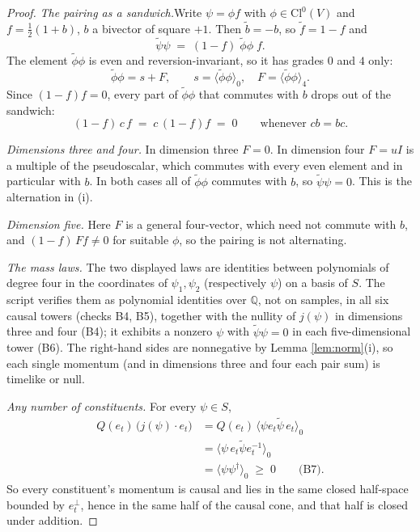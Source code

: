 \documentclass[11pt]{article}
\theoremstyle{definition}
\newcommand{\Cl}{\mathrm{Cl}}
\newcommand{\rev}[1]{\widetilde{#1}}
\newcommand{\ip}[1]{\langle #1 \rangle}
\newcommand{\pstep}[1]{\par\smallskip\noindent\textit{#1.}\enspace}
\begin{document}
\begin{proof}
\textit{The pairing as a sandwich.}\enspace Write $\psi = \phi f$ with $\phi \in \Cl^{0}(V)$ and $f = \tfrac{1}{2}(1 + b)$, $b$ a bivector of square $+1$. Then $\rev{b} = -b$, so $\rev{f} = 1 - f$ and
\[
\rev{\psi}\psi \;=\; (1 - f)\;\rev{\phi}\phi\;f.
\]
The element $\rev{\phi}\phi$ is even and reversion-invariant, so it has grades $0$ and $4$ only:
\[
\rev{\phi}\phi = s + F, \qquad s = \ip{\rev{\phi}\phi}_{0}, \quad F = \ip{\rev{\phi}\phi}_{4}.
\]
Since $(1 - f)f = 0$, every part of $\rev{\phi}\phi$ that commutes with $b$ drops out of the sandwich:
\[
(1 - f)\,c\,f \;=\; c\,(1 - f)f \;=\; 0 \qquad \text{whenever } cb = bc.
\]

\pstep{Dimensions three and four} In dimension three $F = 0$. In dimension four $F = uI$ is a multiple of the pseudoscalar, which commutes with every even element and in particular with $b$. In both cases all of $\rev{\phi}\phi$ commutes with $b$, so $\rev{\psi}\psi = 0$. This is the alternation in (i).

\pstep{Dimension five} Here $F$ is a general four-vector, which need not commute with $b$, and $(1 - f)\,F f \neq 0$ for suitable $\phi$, so the pairing is not alternating.

\pstep{The mass laws} The two displayed laws are identities between polynomials of degree four in the coordinates of $\psi_{1}, \psi_{2}$ (respectively $\psi$) on a basis of $S$. The script verifies them as polynomial identities over $\mathbb{Q}$, not on samples, in all six causal towers (checks B4, B5), together with the nullity of $j(\psi)$ in dimensions three and four (B4); it exhibits a nonzero $\psi$ with $\rev{\psi}\psi = 0$ in each five-dimensional tower (B6). The right-hand sides are nonnegative by Lemma \ref{lem:norm}(i), so each single momentum (and in dimensions three and four each pair sum) is timelike or null.

\pstep{Any number of constituents} For every $\psi \in S$,
\begin{align*}
Q(e_{t})\,\bigl(j(\psi)\cdot e_{t}\bigr) &= Q(e_{t})\,\ip{\psi e_{t}\rev{\psi}\,e_{t}}_{0} \\
&= \ip{\psi\,e_{t}\rev{\psi}e_{t}^{-1}}_{0} \\
&= \ip{\psi\psi^{\dagger}}_{0} \;\geq\; 0 \qquad \text{(B7)}.
\end{align*}
So every constituent's momentum is causal and lies in the same closed half-space bounded by $e_{t}^{\perp}$, hence in the same half of the causal cone, and that half is closed under addition.
\end{proof}
\end{document}
